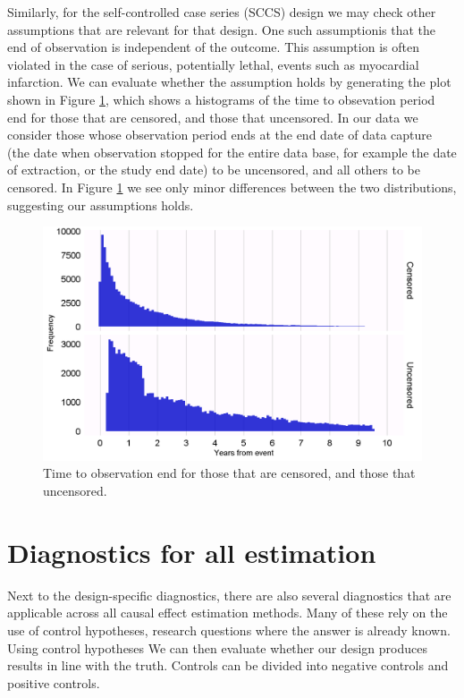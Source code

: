 \documentclass[11pt]{book}
\begin{document}
Similarly, for the self-controlled case series (SCCS) design we may
check other assumptions that are relevant for that design. One such
assumptionis that the end of observation is independent of the outcome.
This assumption is often violated in the case of serious, potentially
lethal, events such as myocardial infarction. We can evaluate whether
the assumption holds by generating the plot shown in Figure
\ref{fig:timeToObsEnd}, which shows a histograms of the time to
obsevation period end for those that are censored, and those that
uncensored. In our data we consider those whose observation period ends
at the end date of data capture (the date when observation stopped for
the entire data base, for example the date of extraction, or the study
end date) to be uncensored, and all others to be censored. In Figure
\ref{fig:timeToObsEnd} we see only minor differences between the two
distributions, suggesting our assumptions holds.

\begin{figure}

{\centering \includegraphics[width=1\linewidth]{images/MethodValidity/timeToObsEnd} 

}

\caption{Time to observation end for those that are censored, and those that uncensored.}\label{fig:timeToObsEnd}
\end{figure}

\section{Diagnostics for all
estimation}\label{diagnostics-for-all-estimation}

Next to the design-specific diagnostics, there are also several
diagnostics that are applicable across all causal effect estimation
methods. Many of these rely on the use of control hypotheses, research
questions where the answer is already known. Using control hypotheses We
can then evaluate whether our design produces results in line with the
truth. Controls can be divided into negative controls and positive
controls.
\end{document}
